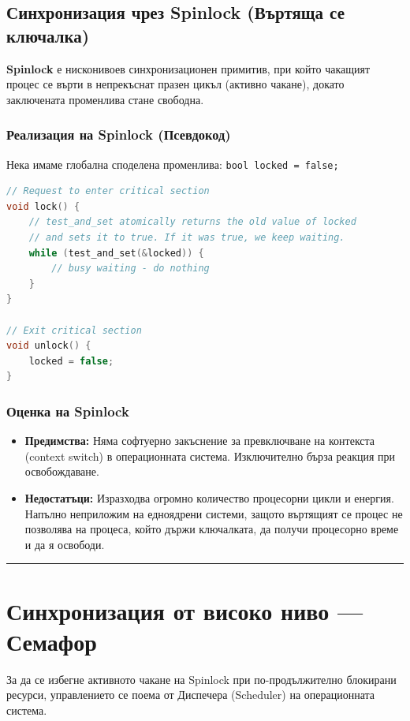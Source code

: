 \documentclass{scrartcl}
\begin{document}
\begin{FlushLeft}
\subsection{Синхронизация чрез Spinlock (Въртяща се ключалка)}
\textbf{Spinlock} е нисконивоев синхронизационен примитив, при който чакащият процес се върти в непрекъснат празен цикъл (активно чакане), докато заключената променлива стане свободна.

\subsubsection{Реализация на Spinlock (Псевдокод)}
Нека имаме глобална споделена променлива: \lstinline|bool locked = false;|

\begin{lstlisting}[language=C++]
// Request to enter critical section
void lock() {
    // test_and_set atomically returns the old value of locked
    // and sets it to true. If it was true, we keep waiting.
    while (test_and_set(&locked)) {
        // busy waiting - do nothing
    }
}

// Exit critical section
void unlock() {
    locked = false;
}
\end{lstlisting}

\subsubsection{Оценка на Spinlock}
\begin{itemize}
    \item \textbf{Предимства:} Няма софтуерно закъснение за превключване на контекста (context switch) в операционната система. Изключително бърза реакция при освобождаване.
    \item \textbf{Недостатъци:} Изразходва огромно количество процесорни цикли и енергия. Напълно неприложим на едноядрени системи, защото въртящият се процес не позволява на процеса, който държи ключалката, да получи процесорно време и да я освободи.
\end{itemize}

\noindent\rule{\linewidth}{0.4pt}

\section{Синхронизация от високо ниво --- Семафор}

За да се избегне активното чакане на Spinlock при по-продължително блокирани ресурси, управлението се поема от Диспечера (Scheduler) на операционната система.


\end{FlushLeft}
\end{document}
